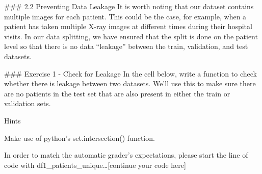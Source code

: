 \documentclass[11pt]{article}
\begin{document}
     \#\#\# 2.2 Preventing Data Leakage It is worth noting that our dataset
contains multiple images for each patient. This could be the case, for
example, when a patient has taken multiple X-ray images at different
times during their hospital visits. In our data splitting, we have
ensured that the split is done on the patient level so that there is no
data ``leakage'' between the train, validation, and test datasets.

     \#\#\# Exercise 1 - Check for Leakage In the cell below, write a
function to check whether there is leakage between two datasets. We'll
use this to make sure there are no patients in the test set that are
also present in either the train or validation sets.

     Hints

Make use of python's set.intersection() function.

In order to match the automatic grader's expectations, please start the
line of code with df1\_patients\_unique\ldots{}{[}continue your code
here{]}
\end{document}
